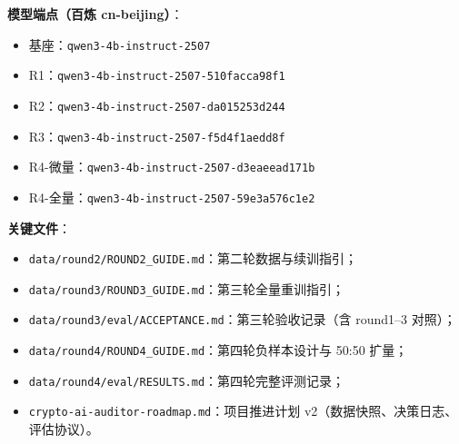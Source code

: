 \documentclass[UTF8,11pt]{ctexart}
\begin{document}
\textbf{模型端点（百炼 cn-beijing）}：

\begin{itemize}
  \item 基座：\texttt{qwen3-4b-instruct-2507}
  \item R1：\texttt{qwen3-4b-instruct-2507-510facca98f1}
  \item R2：\texttt{qwen3-4b-instruct-2507-da015253d244}
  \item R3：\texttt{qwen3-4b-instruct-2507-f5d4f1aedd8f}
  \item R4-微量：\texttt{qwen3-4b-instruct-2507-d3eaeead171b}
  \item R4-全量：\texttt{qwen3-4b-instruct-2507-59e3a576c1e2}
\end{itemize}

\textbf{关键文件}：

\begin{itemize}
  \item \texttt{data/round2/ROUND2\_GUIDE.md}：第二轮数据与续训指引；
  \item \texttt{data/round3/ROUND3\_GUIDE.md}：第三轮全量重训指引；
  \item \texttt{data/round3/eval/ACCEPTANCE.md}：第三轮验收记录（含 round1--3 对照）；
  \item \texttt{data/round4/ROUND4\_GUIDE.md}：第四轮负样本设计与 50:50 扩量；
  \item \texttt{data/round4/eval/RESULTS.md}：第四轮完整评测记录；
  \item \texttt{crypto-ai-auditor-roadmap.md}：项目推进计划 v2（数据快照、决策日志、评估协议）。
\end{itemize}
\end{document}
